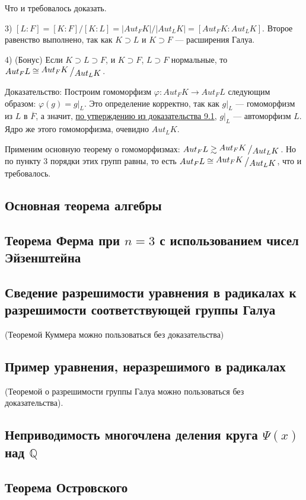 \documentclass[../main.tex]{subfiles}
\begin{document}
    Что и требовалось доказать.

    3) $[L : F] = [K : F] / [K : L] = |Aut_FK| / |Aut_LK| =  [Aut_FK : Aut_LK]$.
    Второе равенство выполнено, так как $K \supset L$ и $K \supset F$
    --- расширения Галуа.

    4) \hypertarget{9.4.bonus}{(Бонус)}
    Если $K \supset L \supset F$, и $K \supset F$, $L \supset F$
    нормальные, то $Aut_FL \cong \bigslant{Aut_FK}{Aut_LK}$.

    Доказательство: Построим гомоморфизм $\varphi: Aut_FK \to Aut_FL$ следующим
    образом: $\varphi(g) = g|_L$. Это определение корректно, так как
    $g|_L$ --- гомоморфизм из $L$ в $\overline{F}$, а значит,
    \hyperlink{9.1.statement.2}{по утверждению из доказательства 9.1},
    $g|_L$ --- автоморфизм $L$. Ядро же этого гомоморфизма, очевидно $Aut_LK$.

    Применим основную теорему о гомоморфизмах:
    $Aut_FL \gtrsim \bigslant{Aut_FK}{Aut_LK}$. Но по пункту 3 порядки этих групп
    равны, то есть $Aut_FL \cong \bigslant{Aut_FK}{Aut_LK}$, что и требовалось.

\hypertarget{9.5}{\subsection{Основная теорема алгебры}}

\hypertarget{9.6}{\subsection{Теорема Ферма при $n = 3$ с использованием чисел Эйзенштейна}}

\hypertarget{9.7}{\subsection{Сведение разрешимости уравнения в радикалах к разрешимости соответствующей группы Галуа}}
(Теоремой Куммера можно пользоваться без доказательства)
\hypertarget{9.8}{\subsection{Пример уравнения, неразрешимого в радикалах}}
(Теоремой о разрешимости группы Галуа можно пользоваться без доказательства).

\hypertarget{9.9}{\subsection{Неприводимость многочлена деления круга $\Psi(x)$ над $\mathbb{Q}$}}

\hypertarget{9.10}{\subsection{Теорема Островского}}
\end{document}
